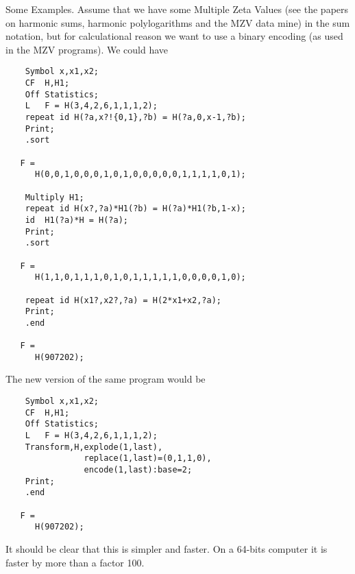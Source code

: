 



Some Examples. Assume that we have some Multiple Zeta Values (see the papers on harmonic sums, harmonic polylogarithms and the MZV 
data mine) in the sum notation, but for calculational 
reason we want to use a binary encoding (as used in the MZV programs). We 
could have

\begin{verbatim}
    Symbol x,x1,x2;
    CF  H,H1;
    Off Statistics;
    L   F = H(3,4,2,6,1,1,1,2);
    repeat id H(?a,x?!{0,1},?b) = H(?a,0,x-1,?b);
    Print;
    .sort

   F =
      H(0,0,1,0,0,0,1,0,1,0,0,0,0,0,1,1,1,1,0,1);

    Multiply H1;
    repeat id H(x?,?a)*H1(?b) = H(?a)*H1(?b,1-x);
    id  H1(?a)*H = H(?a);
    Print;
    .sort

   F =
      H(1,1,0,1,1,1,0,1,0,1,1,1,1,1,0,0,0,0,1,0);

    repeat id H(x1?,x2?,?a) = H(2*x1+x2,?a);
    Print;
    .end

   F =
      H(907202);
\end{verbatim}
The new version of the same program would be
\begin{verbatim}
    Symbol x,x1,x2;
    CF  H,H1;
    Off Statistics;
    L   F = H(3,4,2,6,1,1,1,2);
    Transform,H,explode(1,last),
                replace(1,last)=(0,1,1,0),
                encode(1,last):base=2;
    Print;
    .end

   F =
      H(907202);
\end{verbatim}
It should be clear that this is simpler and faster. On a 64-bits computer 
it is faster by more than a factor 100.

